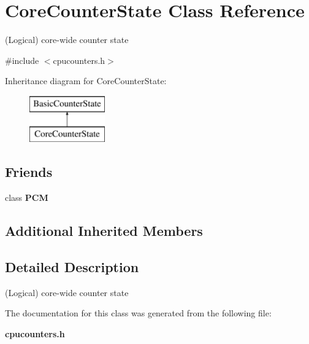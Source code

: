 \section{Core\+Counter\+State Class Reference}
\label{classCoreCounterState}


(Logical) core-\/wide counter state  




{\ttfamily \#include $<$cpucounters.\+h$>$}

Inheritance diagram for Core\+Counter\+State\+:\begin{figure}[H]
\begin{center}
\leavevmode
\includegraphics[height=2.000000cm]{classCoreCounterState}
\end{center}
\end{figure}
\subsection*{Friends}
\begin{DoxyCompactItemize}
\item 
class {\bfseries P\+C\+M}\label{classCoreCounterState_ab5f56d2e95ba3daf52c17b8a1d356d64}

\end{DoxyCompactItemize}
\subsection*{Additional Inherited Members}


\subsection{Detailed Description}
(Logical) core-\/wide counter state 

The documentation for this class was generated from the following file\+:\begin{DoxyCompactItemize}
\item 
{\bf cpucounters.\+h}\end{DoxyCompactItemize}
